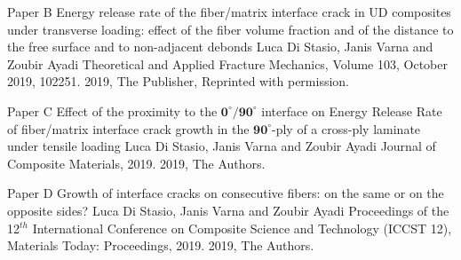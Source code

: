 \documentclass[12pt,a4paper,openright,final,twoside]{msethesis}
\begin{document}



\def\paperheader{Paper B}
\def\papertitle{Energy release rate of the fiber/matrix interface crack in UD composites under transverse loading: effect of the fiber volume fraction and of the distance to the free surface and to non-adjacent debonds}
\def\paperauthorstring{Luca Di Stasio, Janis Varna and Zoubir Ayadi}
\def\referencestring{Theoretical and Applied Fracture Mechanics, Volume 103, October 2019, 102251.}
\def\copyrightstring{2019, The Publisher, Reprinted with permission.}


\newrefsection
\makepaper
  {\paperheader}
  {\papertitle}
  {\paperauthorstring}
  {\referencestring}
  {\copyrightstring}



\def\paperheader{Paper C}
\def\papertitle{Effect of the proximity to the $\mathbf{0^{\circ}/90^{\circ}}$ interface on Energy Release Rate of fiber/matrix interface crack growth in the  $\mathbf{90^{\circ}}$-ply of a cross-ply laminate under tensile loading}
\def\paperauthorstring{Luca Di Stasio, Janis Varna and Zoubir Ayadi}
\def\referencestring{Journal of Composite Materials, 2019.}
\def\copyrightstring{2019, The Authors.}

\newrefsection
\makepapersubmitted
  {\paperheader}
  {\papertitle}
  {\paperauthorstring}
  {\referencestring}
  {\copyrightstring}




\def\paperheader{Paper D}
\def\papertitle{Growth of interface cracks on consecutive fibers: on the same or on the opposite sides?}
\def\paperauthorstring{Luca Di Stasio, Janis Varna and Zoubir Ayadi}
\def\referencestring{Proceedings of the 12$^{th}$ International Conference on Composite Science and Technology (ICCST 12), Materials Today: Proceedings, 2019.}
\def\copyrightstring{2019, The Authors.}

\newrefsection
\makepapersubmitted
  {\paperheader}
  {\papertitle}
  {\paperauthorstring}
  {\referencestring}
  {\copyrightstring}



\end{document}
